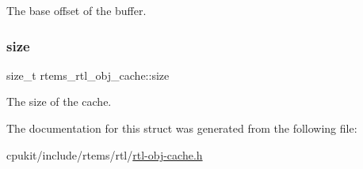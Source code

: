 The base offset of the buffer. \mbox{\label{structrtems__rtl__obj__cache_a3ceefd27ca6b0fa48f1803dc8e72dcda}} 
\subsubsection{\texorpdfstring{size}{size}}
{\footnotesize\ttfamily size\+\_\+t rtems\+\_\+rtl\+\_\+obj\+\_\+cache\+::size}

The size of the cache. 

The documentation for this struct was generated from the following file\+:\begin{DoxyCompactItemize}
\item 
cpukit/include/rtems/rtl/\mbox{\hyperlink{rtl-obj-cache_8h}{rtl-\/obj-\/cache.\+h}}\end{DoxyCompactItemize}
